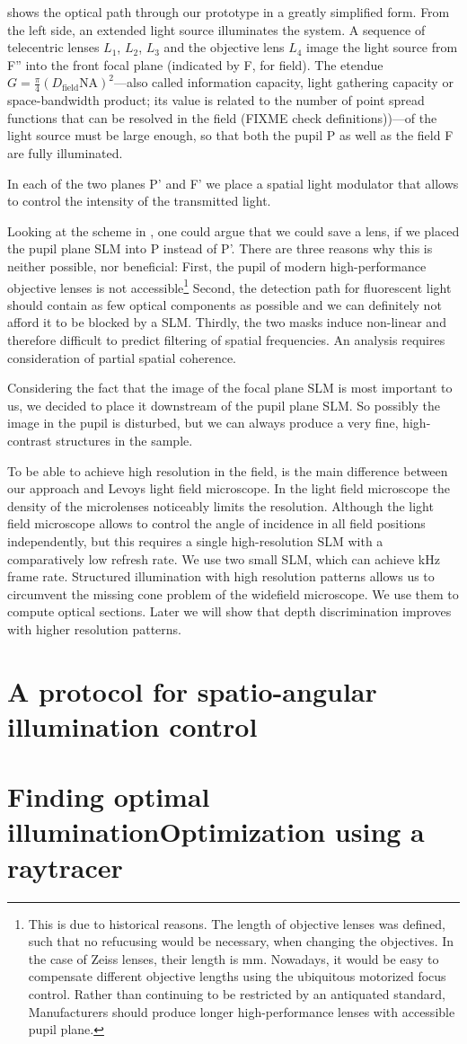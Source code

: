  shows the optical path through our prototype
in a greatly simplified form.  From the left side, an extended light
source illuminates the system. A sequence of telecentric lenses $L_1$,
$L_2$, $L_3$ and the objective lens $L_4$ image the light source from
F'' into the front focal plane (indicated by F, for field). The
etendue $G=\frac{\pi}{4}(D_\textrm{field}\textrm{NA})^2$---also called
information capacity, light gathering capacity or space-bandwidth
product; its value is related to the number of point spread functions
that can be resolved in the field (FIXME check definitions))---of the
light source must be large enough, so that both the pupil P as well as
the field F are fully illuminated.

In each of the two planes P' and F' we place a spatial light modulator
that allows to control the intensity of the transmitted light.

Looking at the scheme in , one could argue
that we could save a lens, if we placed the pupil plane SLM into P
instead of P'. There are three reasons why this is neither possible,
nor beneficial: First, the pupil of modern high-performance objective
lenses is not accessible\footnote{This is due to historical reasons.
  The length of objective lenses was defined, such that no refucusing
  would be necessary, when changing the objectives. In the case of
  Zeiss lenses, their length is \unit[45]{mm}. Nowadays, it would be
  easy to compensate different objective lengths using the ubiquitous
  motorized focus control.  Rather than continuing to be restricted by
  an antiquated standard, Manufacturers should produce longer
  high-performance lenses with accessible pupil plane.}  Second, the
detection path for fluorescent light should contain as few optical
components as possible and we can definitely not afford it to be
blocked by a SLM.  Thirdly, the two masks induce non-linear and
therefore difficult to predict filtering of spatial frequencies. An
analysis requires consideration of partial spatial coherence.

Considering the fact that the image of the focal plane SLM is most
important to us, we decided to place it downstream of the pupil plane
SLM. So possibly the image in the pupil is disturbed, but we can
always produce a very fine, high-contrast structures in the sample.

To be able to achieve high resolution in the field, is the main
difference between our approach and Levoys light field microscope.  In
the light field microscope the density of the microlenses noticeably
limits the resolution. Although the light field microscope allows to
control the angle of incidence in all field positions independently,
but this requires a single high-resolution SLM with a comparatively
low refresh rate. We use two small SLM, which can achieve
\unit[1]{kHz} frame rate. Structured illumination with high resolution
patterns allows us to circumvent the missing cone problem of the
widefield microscope. We use them to compute optical sections. Later
we will show that depth discrimination improves with higher resolution
patterns.
\section{A protocol for spatio-angular illumination control}
\section{Finding optimal illuminationOptimization using a raytracer}
